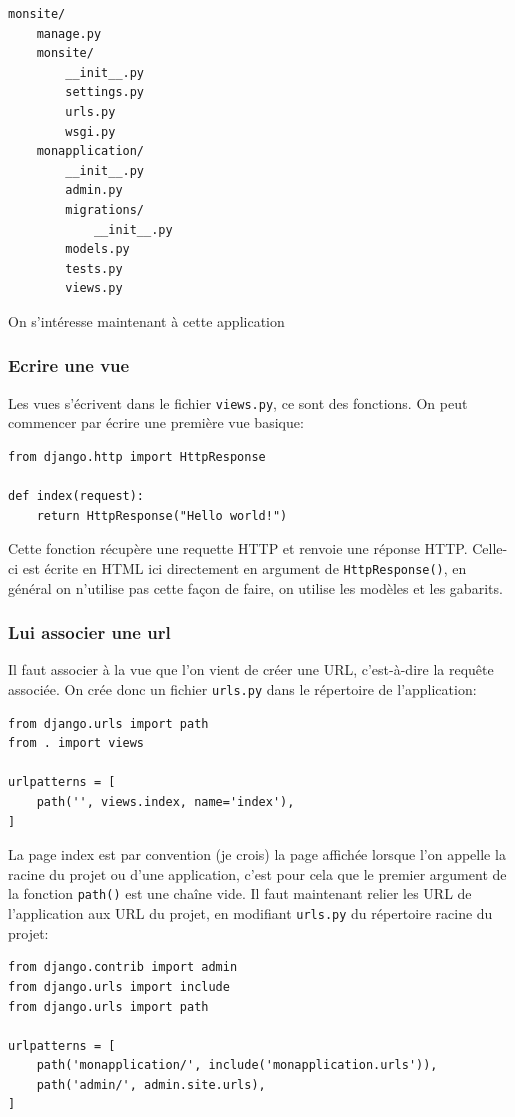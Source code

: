 \documentclass[a4paper, 10pt]{article}
\begin{document}
\begin{verbatim}
monsite/
    manage.py
    monsite/
        __init__.py
        settings.py
        urls.py
        wsgi.py
    monapplication/
        __init__.py
        admin.py
        migrations/
            __init__.py
        models.py
        tests.py
        views.py
\end{verbatim}

On s'intéresse maintenant à cette application

\subsubsection{Ecrire une vue}
Les vues s'écrivent dans le fichier \texttt{views.py}, ce sont des fonctions. On peut commencer par écrire une première vue basique:

\begin{verbatim}
from django.http import HttpResponse

def index(request):
    return HttpResponse("Hello world!")
\end{verbatim}

Cette fonction récupère une requette HTTP et renvoie une réponse HTTP. Celle-ci est écrite en HTML ici directement en argument de \texttt{HttpResponse()}, en général on n'utilise pas cette façon de faire, on utilise les modèles et les gabarits.

\subsubsection{Lui associer une url}
Il faut associer à la vue que l'on vient de créer une URL, c'est-à-dire la requête associée. On crée donc un fichier \texttt{urls.py} dans le répertoire de l'application:
\begin{verbatim}
from django.urls import path
from . import views

urlpatterns = [
    path('', views.index, name='index'),
]
\end{verbatim}

La page \og index \fg{} est par convention (je crois) la page affichée lorsque l'on appelle la racine du projet ou d'une application, c'est pour cela que le premier argument de la fonction \texttt{path()} est une chaîne vide. Il faut maintenant relier les URL de l'application aux URL du projet, en modifiant \texttt{urls.py} du répertoire racine du projet:

\begin{verbatim}
from django.contrib import admin
from django.urls import include
from django.urls import path

urlpatterns = [
    path('monapplication/', include('monapplication.urls')),
    path('admin/', admin.site.urls),
]
\end{verbatim}
\end{document}
